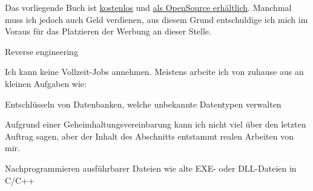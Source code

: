 \vspace*{\fill}

\iffalse
\huge
	Bitte nehmen Sie an der kurzen Umfrage teil, unter
\normalsize

\bigskip
\bigskip
\bigskip

\dots \url{https://beginners.re/survey.html}.
Dies kann sehr hilfreich für den Autor sein!

\bigskip
\bigskip
\bigskip
\fi

\huge
\normalsize

\bigskip
\bigskip
\bigskip

Das vorliegende Buch ist \href{http://beginners.re/}{kostenlos} und
\href{\RepoURL}{als OpenSource erhältlich}.
Manchmal muss ich jedoch auch Geld verdienen, aus diesem Grund entschuldige ich mich im Voraus
für das Platzieren der Werbung an dieser Stelle.

\iffalse
\Large Benötigen Sie Dokumentationen? \normalsize

Ich kann versuchen Dokumentationen, Referenzen und Handbücher für einige APIs,
Sprachen, Frameworks und so weiter zu schreiben.

Manchmal bin ich gut im Finden von präzisen und klaren Beispielen für jedes API- oder Sprachfeature.
Dieses Buch ist ein Beispiel dafür.
Ich kann versuchen dies in einer ausführlichen und zuverlässigen Art zu tun.

Auf der anderen Seite ist mein Englisch weit entfernt davon fließend zu sein und
ich könnte lange brauchen um mich tief in Produkte einzuarbeiten die ich nicht kenne.

Ich wäre aber erfreut existierende Dokumentationsprojekte zu überarbeiten.
Eine Beispielreferenz die ich bewundere ist Wolfram Mathematica: \url{http://reference.wolfram.com/language/}.
\fi

\Large Reverse engineering \normalsize

Ich kann keine Vollzeit-Jobs annehmen. Meistens arbeite ich von zuhause aus an kleinen Aufgaben wie:

\large Entschlüsseln von Datenbanken, welche unbekannte Datentypen verwalten \normalsize

Aufgrund einer Geheimhaltungsvereinbarung kann ich nicht viel über den letzten Auftrag
sagen, aber der Inhalt des Abschnitts  entstammt realen Arbeiten von mir.

\large Nachprogrammieren ausführbarer Dateien wie alte EXE- oder DLL-Dateien in C/C++ \normalsize

